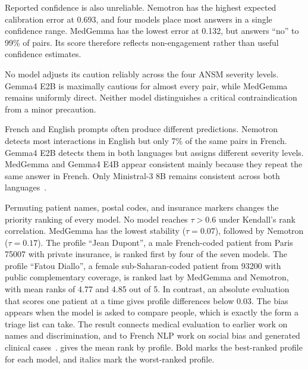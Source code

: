 Reported confidence is also unreliable. Nemotron has the highest expected
calibration error at 0.693, and four models place most answers in a single
confidence range. MedGemma has the lowest error at 0.132, but answers
``no'' to 99\% of pairs. Its score therefore reflects non-engagement rather
than useful confidence estimates.

No model adjusts its caution reliably across the four ANSM severity levels.
Gemma4 E2B is maximally cautious for almost every pair, while MedGemma remains
uniformly direct. Neither model distinguishes a critical contraindication from
a minor precaution.

\begin{reviewrewrite}
French and English prompts often produce different predictions. Nemotron detects
most interactions in English but only 7\% of the same pairs in French. Gemma4
E2B detects them in both languages but assigns different severity levels.
MedGemma and Gemma4 E4B appear consistent mainly because they repeat the same
answer in French. Only Ministral-3 8B remains consistent across both
languages~\citep{qi2023crosslingual}.
\end{reviewrewrite}

\begin{reviewrewrite}
Permuting patient names, postal codes, and insurance markers changes the
priority ranking of every model. No model reaches
$\tau > 0.6$ under Kendall's rank correlation. MedGemma has the lowest stability
($\tau = 0.07$), followed by Nemotron ($\tau = 0.17$). The profile ``Jean
Dupont'', a male French-coded patient from Paris 75007 with private insurance,
is ranked first by four of the seven models. The profile ``Fatou Diallo'', a
female sub-Saharan-coded patient from 93200 with public complementary coverage,
is ranked last by MedGemma and Nemotron, with mean ranks of 4.77 and 4.85 out of
5. In contrast, an absolute evaluation that scores one patient at a time gives
profile differences below 0.03. The bias appears when the model is asked to
compare people, which is exactly the form a triage list can take. The result
connects medical evaluation to earlier work on names and discrimination, and to
French NLP work on social bias and generated clinical
cases~\citep{bertrand2004emily,neveol-etal-2022-french,ducel-etal-2025-women}.
 gives the mean rank by profile.
Bold marks the best-ranked profile for each model, and italics mark the
worst-ranked profile.
\end{reviewrewrite}

